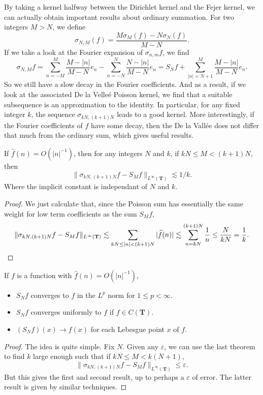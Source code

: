By taking a kernel halfway between the Dirichlet kernel and the Fejer kernel, we can actually obtain important results about ordinary summation. For two integers $M > N$, we define
%
\[ \sigma_{N,M}(f) = \frac{M\sigma_M(f) - N\sigma_N(f)}{M-N}. \]
%
If we take a look at the Fourier expansion of $\sigma_{n,m} f$, we find
%
\[ \sigma_{N,M} f = \sum_{n = -M}^M \frac{M - |n|}{M-N} e_n - \sum_{n = -N}^N \frac{N - |n|}{M-N} e_n = S_N f + \sum_{|n| = N+1}^M \frac{M - |n|}{M - N} e_n. \]
%
So we still have a slow decay in the Fourier coefficients. And as a result, if we look at the associated De la Velle\'{e} Poisson kernel, we find that a suitable subsequence is an approximation to the identity. In particular, for any fixed integer $k$, the sequence $\sigma_{kN,(k+1)N}$ leads to a good kernel. More interestingly, if the Fourier coefficients of $f$ have some decay, then the De la Vall\'{e}e does not differ that much from the ordinary sum, which gives useful results.

\begin{theorem}
	If $\widehat{f}(n) = O(|n|^{-1})$, then for any integers $N$ and $k$, if $kN \leq M < (k+1)N$, then
	\[ \| \sigma_{kN,(k+1)N} f - S_M f \|_{L^\infty(\mathbf{T})} \lesssim 1/k. \]
	Where the implicit constant is independant of $N$ and $k$.
\end{theorem}
\begin{proof}
	We just calculate that, since the Poisson sum has essentially the same weight for low term coefficients as the sum $S_M f$,
	\[ \| \sigma_{kN,(k+1)N} f - S_M f \|_{L^\infty(\mathbf{T})} \lesssim \sum_{kN \leq |n| < (k+1)N} |\widehat{f}(n)| \lesssim \sum_{n = kN}^{(k+1)N} \frac{1}{n} \leq \frac{N}{kN} = \frac{1}{k}. \qedhere \]
\end{proof}

\begin{corollary}
	If $f$ is a function with $\widehat{f}(n) = O(|n|^{-1})$,
	\begin{itemize}
		\item $S_Nf$ converges to $f$ in the $L^p$ norm for $1 \leq p < \infty$.
		\item $S_Nf$ converges uniformly to $f$ if $f \in C(\mathbf{T})$.
		\item $(S_N f)(x) \to f(x)$ for each Lebesgue point $x$ of $f$.
	\end{itemize}
\end{corollary}
\begin{proof}
	The idea is quite simple. Fix $N$. Given any $\varepsilon$, we can use the last theorem to find $k$ large enough such that if $kN \leq M < k(N+1)$,
	\[ \| \sigma_{kN,(k+1)N} f - S_M f \|_{L^\infty(\mathbf{T})} \leq \varepsilon. \]
	But this gives the first and second result, up to perhaps a $\varepsilon$ of error. The latter result is given by similar techniques.
\end{proof}


